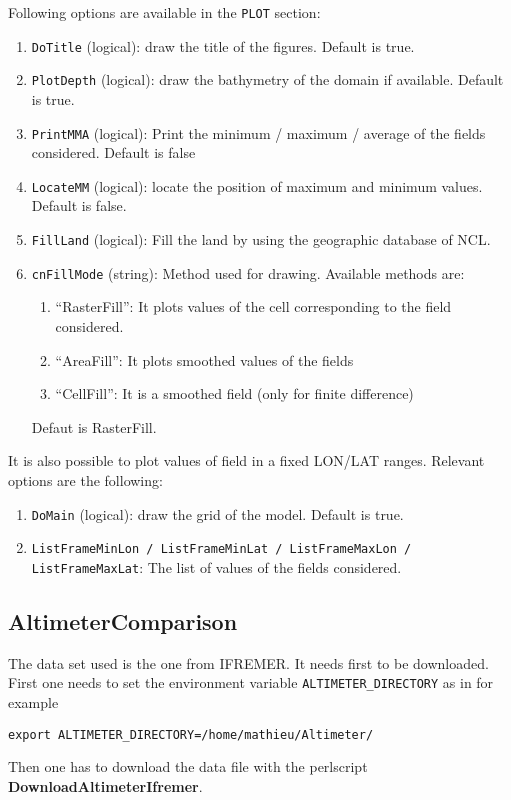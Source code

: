 \documentclass[12pt]{amsart}
\begin{document}
Following options are available in the {\tt PLOT} section:
\begin{enumerate}
\item {\tt DoTitle} (logical): draw the title of the figures. Default is true.
\item {\tt PlotDepth} (logical): draw the bathymetry of the domain if available. Default is true.
\item {\tt PrintMMA} (logical): Print the minimum / maximum / average of the fields considered. Default is false
\item {\tt LocateMM} (logical): locate the position of maximum and minimum values. Default is false.
\item {\tt FillLand} (logical): Fill the land by using the geographic database of NCL.
\item {\tt cnFillMode} (string): Method used for drawing. Available methods are:
  \begin{enumerate}
  \item ``RasterFill'': It plots values of the cell corresponding to the field considered.
  \item ``AreaFill'': It plots smoothed values of the fields
  \item ``CellFill'': It is a smoothed field (only for finite difference)
  \end{enumerate}
  Defaut is RasterFill.
\end{enumerate}

It is also possible to plot values of field in a fixed LON/LAT ranges. Relevant options are the following:
\begin{enumerate}
\item {\tt DoMain} (logical): draw the grid of the model. Default is true.
\item {\tt ListFrameMinLon / ListFrameMinLat / ListFrameMaxLon / ListFrameMaxLat}: The list of values of the fields considered.
\end{enumerate}










\subsection{AltimeterComparison}

The data set used is the one from IFREMER. It needs first to be downloaded.
First one needs to set the environment variable {\tt ALTIMETER\_DIRECTORY}
as in for example
\begin{verbatim}
export ALTIMETER_DIRECTORY=/home/mathieu/Altimeter/
\end{verbatim}
Then one has to download the data file with the perlscript {\bf DownloadAltimeterIfremer}.
\end{document}
